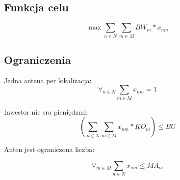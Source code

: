 \documentclass{article}
\begin{document}
\subsection{Funkcja celu}

\begin{equation}
  \max \sum_{n \in N} \sum_{m \in M} BW_m * x_{nm}
\end{equation}

\subsection{Ograniczenia}

Jedna antena per lokalizacja:
\begin{equation}
  \forall_{n \in N} \sum_{m \in M} x_{nm} = 1
\end{equation}

Inwestor nie sra pieniędzmi:
\begin{equation}
  (\sum_{n \in N} \sum_{m \in M} x_{nm} * {KO}_m) \leq BU
\end{equation}

Anten jest ograniczona liczba:

\begin{equation}
  \forall_{m \in M} \sum_{n \in N} x_{nm} \leq {MA}_m
\end{equation}
\end{document}
